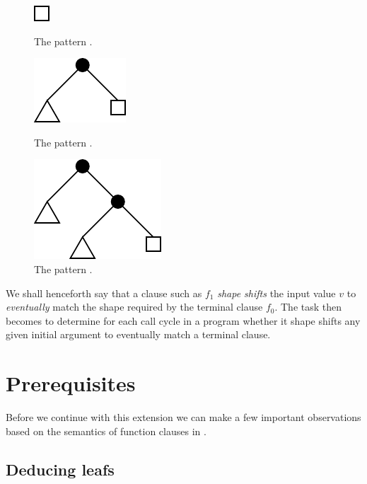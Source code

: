 \begin{figure}[htbp!]
\begin{minipage}{0.3\linewidth}
\centering
\includegraphics{figures/size-change-fail-f1-0}
\caption[]{The pattern .}
\label{figure:size-change-fail-f1-0}
\end{minipage}
\begin{minipage}{0.3\linewidth}
\centering
\includegraphics{figures/size-change-fail-f1-1}
\caption[]{The pattern .}
\label{figure:size-change-fail-f1-1}
\end{minipage}
\begin{minipage}{0.3\linewidth}
\centering
\includegraphics{figures/size-change-fail-f1-2}
\caption[]{The pattern .}
\label{figure:size-change-fail-f1-2}
\end{minipage}
\end{figure}

We shall henceforth say that a clause such as $f_1$ \emph{shape shifts} the
input value $v$ to \emph{eventually} match the shape required by the terminal
clause $f_0$. The task then becomes to determine for each call cycle in a
program whether it shape shifts any given initial argument to eventually match
a terminal clause.

\section{Prerequisites}

Before we continue with this extension we can make a few important observations
based on the semantics of function clauses in \D{}.

\subsection{Deducing leafs}\label{section:extend-deducing-zero}

